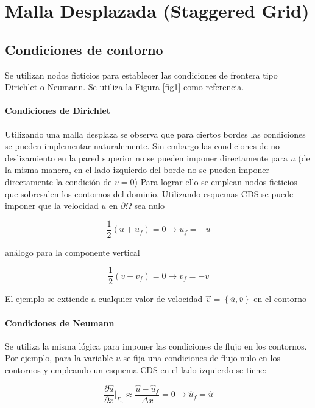 \section{Malla Desplazada (Staggered Grid)}

\subsection{Condiciones de contorno}
Se utilizan nodos ficticios para establecer las condiciones de frontera tipo Dirichlet o Neumann. Se utiliza la Figura \ref{fig1} como referencia.

\paragraph{Condiciones de Dirichlet} Utilizando una malla desplaza se observa que para ciertos bordes las condiciones se pueden implementar naturalemente. Sin embargo las condiciones de no deslizamiento en la pared superior no se pueden imponer directamente para $u$ (de la misma manera, en el lado izquierdo del borde no se pueden imponer directamente la condición de $v=0$) Para lograr ello se emplean nodos ficticios que sobresalen los contornos del dominio. Utilizando esquemas CDS se puede imponer que la velocidad $u$ en $\partial \Omega$ sea nulo

\begin{equation}
\dfrac{1}{2} (u + u_f) = 0 \rightarrow u_f = -u
\end{equation}

análogo para la componente vertical

\begin{equation}
\dfrac{1}{2} (v + v_f) = 0 \rightarrow v_f = -v
\end{equation}

El ejemplo se extiende a cualquier valor de velocidad $\vec{v} = \left\{ \overline{u}, \overline{v} \right\}$ en el contorno

\paragraph{Condiciones de Neumann} Se utiliza la misma lógica para imponer las condiciones de flujo en los contornos. Por ejemplo, para la variable $u$ se fija una condiciones de flujo nulo en los contornos y empleando un esquema CDS en el lado izquierdo se tiene:

\begin{equation}
\dfrac{\partial \hat{u}}{\partial x} \Big|_{\Gamma_u} \approx \dfrac{\hat{u}-\hat{u}_f}{\Delta x} = 0  \rightarrow  \hat{u}_f = \hat{u}
\end{equation}

